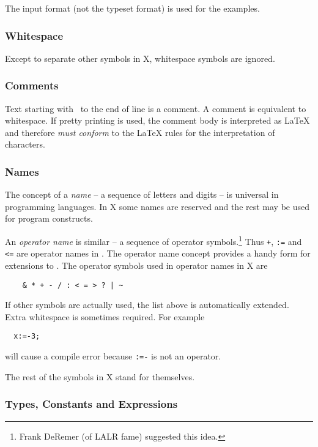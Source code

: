 The input format (not the typeset format) is used for the examples.

\subsubsection{Whitespace}

Except to separate other symbols in X, whitespace symbols are ignored.

\subsubsection{Comments}

Text starting with \bq\ to the end of line is a comment.  A comment is 
equivalent to whitespace.  If pretty printing is used, the comment
body is interpreted as LaTeX and therefore {\em must conform}
to the LaTeX rules for the interpretation of characters.

\subsubsection{Names}

The concept of a {\em name} -- a sequence of letters and digits -- is 
universal in programming languages.  In X some names are reserved and 
the rest may be used for program constructs.

An {\em operator name\/} is similar -- a sequence of operator 
symbols.\footnote{Frank DeRemer (of LALR fame) suggested this idea.}  
Thus {\tt +}, {\tt :=} and {\tt <=} are operator names in .  
The operator name concept provides a handy form for extensions to .
The operator symbols used in operator names in X are

\begin{verbatim}
    & * + - / : < = > ? | ~
\end{verbatim}

\noindent If other symbols are actually used, the list above is 
automatically extended.  Extra whitespace is sometimes required.  
For example
\begin{verbatim}
  x:=-3;
\end{verbatim}
\noindent will cause a compile error because {\tt :=-} is not an operator.  

The rest of the symbols in X stand for themselves.

\subsubsection{Types, Constants and Expressions}

